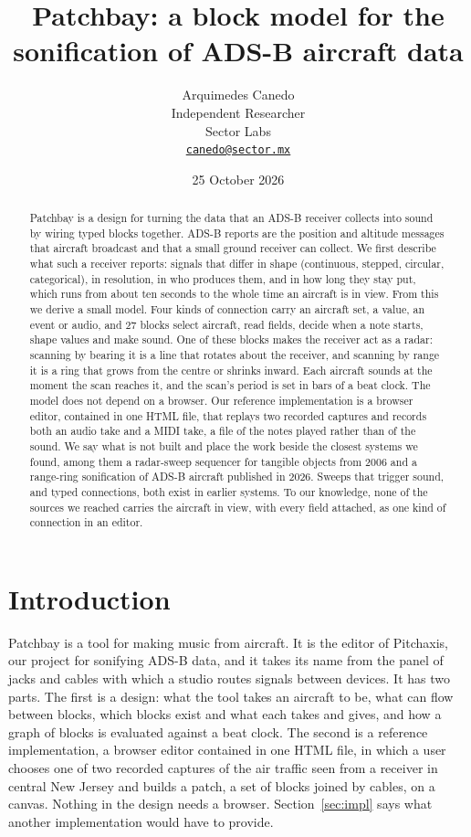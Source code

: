 \documentclass[11pt,letterpaper]{article}
\title{Patchbay: a block model for the sonification of ADS-B aircraft data}
\author{Arquimedes Canedo\\Independent Researcher\\Sector Labs\\\href{mailto:canedo@sector.mx}{\texttt{canedo@sector.mx}}}
\date{25 October 2026}
\begin{document}
\maketitle

\begin{abstract}
Patchbay is a design for turning the data that an ADS-B receiver collects into sound by wiring typed blocks together. ADS-B reports are the position and altitude messages that aircraft broadcast and that a small ground receiver can collect. We first describe what such a receiver reports: signals that differ in shape (continuous, stepped, circular, categorical), in resolution, in who produces them, and in how long they stay put, which runs from about ten seconds to the whole time an aircraft is in view. From this we derive a small model. Four kinds of connection carry an aircraft set, a value, an event or audio, and 27 blocks select aircraft, read fields, decide when a note starts, shape values and make sound. One of these blocks makes the receiver act as a radar: scanning by bearing it is a line that rotates about the receiver, and scanning by range it is a ring that grows from the centre or shrinks inward. Each aircraft sounds at the moment the scan reaches it, and the scan's period is set in bars of a beat clock. The model does not depend on a browser. Our reference implementation is a browser editor, contained in one HTML file, that replays two recorded captures and records both an audio take and a MIDI take, a file of the notes played rather than of the sound. We say what is not built and place the work beside the closest systems we found, among them a radar-sweep sequencer for tangible objects from 2006 and a range-ring sonification of ADS-B aircraft published in 2026. Sweeps that trigger sound, and typed connections, both exist in earlier systems. To our knowledge, none of the sources we reached carries the aircraft in view, with every field attached, as one kind of connection in an editor.
\end{abstract}

\section{Introduction}

Patchbay is a tool for making music from aircraft. It is the editor of Pitchaxis, our project for sonifying ADS-B data, and it takes its name from the panel of jacks and cables with which a studio routes signals between devices. It has two parts. The first is a design: what the tool takes an aircraft to be, what can flow between blocks, which blocks exist and what each takes and gives, and how a graph of blocks is evaluated against a beat clock. The second is a reference implementation, a browser editor contained in one HTML file, in which a user chooses one of two recorded captures of the air traffic seen from a receiver in central New Jersey and builds a patch, a set of blocks joined by cables, on a canvas. Nothing in the design needs a browser. Section~\ref{sec:impl} says what another implementation would have to provide.
\end{document}
